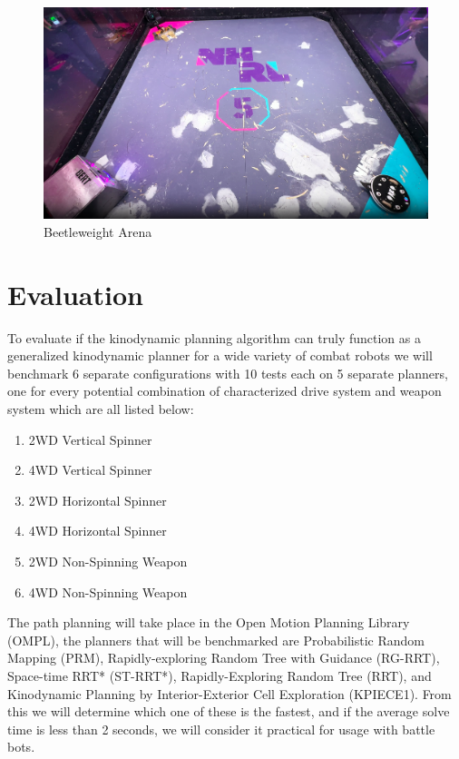 \documentclass[conference]{IEEEtran}
\begin{document}
\begin{figure}[htp]
\centering
\includegraphics[scale=0.125]{arena.png}
\caption{Beetleweight Arena}
\label{Beetleweight Arena}
\end{figure}

\section{Evaluation}
To evaluate if the kinodynamic planning algorithm can truly function as a generalized kinodynamic planner for a wide variety of combat robots we will benchmark 6 separate configurations with 10 tests each on 5 separate planners, one for every potential combination of characterized drive system and weapon system which are all listed below:

\begin{enumerate}
\item{2WD Vertical Spinner}
\item{4WD Vertical Spinner}
\item{2WD Horizontal Spinner}
\item{4WD Horizontal Spinner}
\item{2WD Non-Spinning Weapon}
\item{4WD Non-Spinning Weapon}
\end{enumerate}

The path planning will take place in the Open Motion Planning Library (OMPL), the planners that will be benchmarked are Probabilistic Random Mapping (PRM), Rapidly-exploring Random Tree with Guidance (RG-RRT), Space-time RRT* (ST-RRT*), Rapidly-Exploring Random Tree (RRT), and Kinodynamic Planning by Interior-Exterior Cell Exploration (KPIECE1).  From this we will determine which one of these is the fastest, and if the average solve time is less than 2 seconds, we will consider it practical for usage with battle bots.
\end{document}
